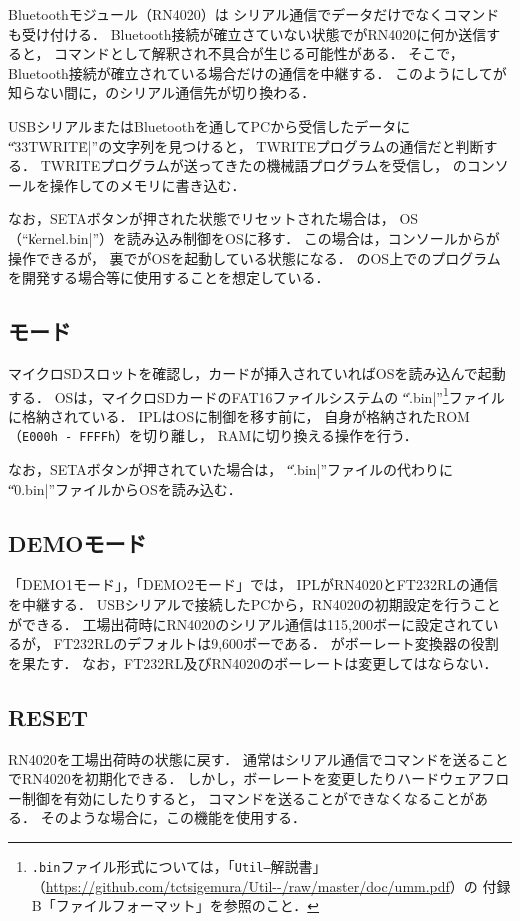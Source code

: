 Bluetoothモジュール（RN4020）は
シリアル通信でデータだけでなくコマンドも受け付ける．
Bluetooth接続が確立さていない状態で{\tac}がRN4020に何か送信すると，
コマンドとして解釈され不具合が生じる可能性がある．
そこで，Bluetooth接続が確立されている場合だけ{\tec}の通信を中継する．
このようにして{\tec}が知らない間に，{\tec}のシリアル通信先が切り換わる．

USBシリアルまたはBluetoothを通してPCから受信したデータに
``\|\033TWRITE\r\n|''の文字列を見つけると，
TWRITEプログラムの通信だと判断する．
TWRITEプログラムが送ってきた{\tec}の機械語プログラムを受信し，
{\tec}のコンソールを操作して{\tec}のメモリに書き込む．

なお，SETAボタンが押された状態でリセットされた場合は，
OS（``\|kernel.bin|''）を読み込み制御をOSに移す．
この場合は，コンソールから{\tec}が操作できるが，
裏で{\tac}がOSを起動している状態になる．
{\tac}のOS上で{\tec}のプログラムを開発する場合等に使用することを想定している．

\subsection{{\tac}モード}
マイクロSDスロットを確認し，カードが挿入されていればOSを読み込んで起動する．
OSは，マイクロSDカードのFAT16ファイルシステムの
``\|.bin|''\footnote{
\texttt{.bin}ファイル形式については，「\texttt{Util--}解説書」
（\url{https://github.com/tctsigemura/Util--/raw/master/doc/umm.pdf}）の
付録B「ファイルフォーマット」を参照のこと．
}ファイルに格納されている．
IPLはOSに制御を移す前に，
自身が格納されたROM（\texttt{E000h - FFFFh}）を切り離し，
RAMに切り換える操作を行う．

なお，SETAボタンが押されていた場合は，
``\|.bin|''ファイルの代わりに
``\|0.bin|''ファイルからOSを読み込む．

\subsection{DEMOモード}
「DEMO1モード」，「DEMO2モード」では，
IPLがRN4020とFT232RLの通信を中継する．
USBシリアルで接続したPCから，RN4020の初期設定を行うことができる．
工場出荷時にRN4020のシリアル通信は115,200ボーに設定されているが，
FT232RLのデフォルトは9,600ボーである．
{\tac}がボーレート変換器の役割を果たす．
なお，FT232RL及びRN4020のボーレートは変更してはならない．

\subsection{RESET}
RN4020を工場出荷時の状態に戻す．
通常はシリアル通信でコマンドを送ることでRN4020を初期化できる．
しかし，ボーレートを変更したりハードウェアフロー制御を有効にしたりすると，
コマンドを送ることができなくなることがある．
そのような場合に，この機能を使用する．

